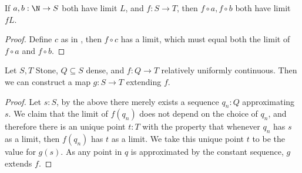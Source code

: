 \begin{lemma}
  If $a,b:\N \to S$ both have limit $L$, and $f:S \to T$, then 
  $f\circ a,f\circ b$ both have limit $fL$. 
\end{lemma}
\begin{proof}
  Define $c$ as in , then $f \circ c$ has a limit, which must equal both the limit of $f\circ a$ and $f\circ b$. 
\end{proof}

\begin{theorem}
  Let $S,T$ Stone, $Q\subseteq S$ dense, and $f : Q \to T$ relatively uniformly continuous. 
  Then we can construct a map $g: S \to T$ extending $f$. 
\end{theorem}
\begin{proof}
  Let $s:S$, by the above there merely exists a sequence $q_n :Q$ approximating $s$. 
  We claim that the limit of $f(q_n)$ does not depend on the choice of $q_n$, and therefore there is an unique point $t:T$ with the property that whenever $q_n$ has $s$ as a limit, then $f(q_n)$ has $t$ as a limit. 
  We take this unique point $t$ to be the value for $g(s)$. 
  As any point in $q$ is approximated by the constant sequence, $g$ extends $f$. 
\end{proof}








